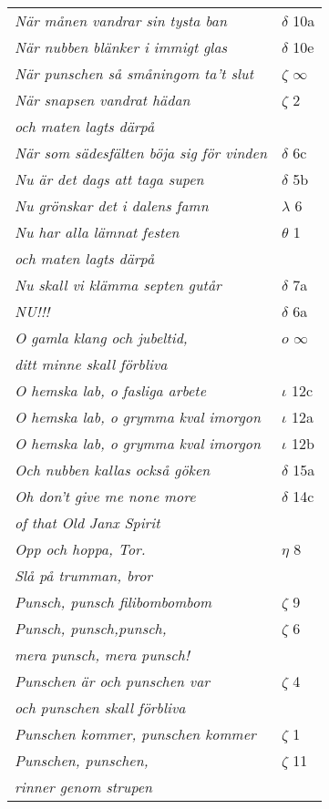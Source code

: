 \documentclass[a6paper,10pt]{article}
\begin{document}
\newpage
\begin{table}[!h]
\begin{tabular}{l l}
\textit{När månen vandrar sin tysta ban}	&$\delta$ 10a\\
\textit{När nubben blänker i immigt glas}	&$\delta$ 10e\\
\textit{När punschen så småningom ta't slut}	&$\zeta$ $\infty$\\
\textit{När snapsen vandrat hädan}	&$\zeta$ 2\\
\textit{och maten lagts därpå} &\\
\textit{När som sädesfälten böja sig för vinden}	&$\delta$ 6c\\
\textit{Nu är det dags att taga supen}	&$\delta$ 5b\\
\textit{Nu grönskar det i dalens famn}	&$\lambda$ 6\\
\textit{Nu har alla lämnat festen}	&$\theta$ 1\\
\textit{och maten lagts därpå} &\\
\textit{Nu skall vi klämma septen gutår}	&$\delta$ 7a\\
\textit{NU!!!}	&$\delta$ 6a\\
\textit{O gamla klang och jubeltid,}	&$o$ $\infty$\\
\textit{ditt minne skall förbliva} &\\
\textit{O hemska lab, o fasliga arbete}	&$\iota$ 12c\\
\textit{O hemska lab, o grymma kval imorgon}	&$\iota$ 12a\\
\textit{O hemska lab, o grymma kval imorgon}	&$\iota$ 12b\\
\textit{Och nubben kallas också göken}	&$\delta$ 15a\\
\textit{Oh don't give me none more}	&$\delta$ 14c\\
\textit{of that Old Janx Spirit} &\\
\textit{Opp och hoppa, Tor.}	&$\eta$ 8\\
\textit{Slå på trumman, bror} &\\
\textit{Punsch, punsch filibombombom}	&$\zeta$ 9\\
\textit{Punsch, punsch,punsch,}	&$\zeta$ 6\\
\textit{mera punsch, mera punsch!} &\\
\textit{Punschen är och punschen var}	&$\zeta$ 4\\
\textit{och punschen skall förbliva} &\\
\textit{Punschen kommer, punschen kommer}	&$\zeta$ 1\\
\textit{Punschen, punschen,}	&$\zeta$ 11\\
\textit{rinner genom strupen} &\\
\end{tabular}
\end{table}
\end{document}
